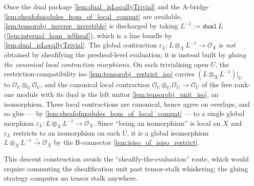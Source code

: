 \begin{remark}
  \label{rem:dual_discharges_inverse}
  Once the dual package \cref{lem:dual_isLocallyTrivial} and the A-bridge
  \cref{lem:sheafofmodules_hom_of_local_compat} are available,
  \cref{lem:tensorobj_inverse_invertible} is discharged by taking \(L^{-1} := \mathtt{dual}\,L\)
  (\cref{lem:internal_hom_isSheaf}), which is a line
  bundle by \cref{lem:dual_isLocallyTrivial}. The global contraction \(\varepsilon_L
  \colon L \otimes_X L^{-1} \to \mathcal{O}_X\) is \emph{not} obtained by sheafifying
  the presheaf-level evaluation; it is instead built by \emph{gluing the canonical local
  contraction morphisms}. On each trivialising open \(U\), the
  restriction-compatibility iso \cref{lem:tensorobj_restrict_iso} carries
  \((L \otimes_X L^{-1})|_U\) to \(\mathcal{O}_U \otimes_U \mathcal{O}_U\), and the
  canonical local contraction \(\mathcal{O}_U \otimes_U \mathcal{O}_U \to \mathcal{O}_U\)
  of the free rank-one module with its dual is the left unitor
  \cref{lem:tensorobj_unit_iso}, an isomorphism. These local contractions are canonical,
  hence agree on overlaps, and so glue --- by
  \cref{lem:sheafofmodules_hom_of_local_compat} --- to a single global morphism
  \(\varepsilon_L \colon L \otimes_X L^{-1} \to \mathcal{O}_X\). Since ``being an
  isomorphism'' is local on \(X\) and \(\varepsilon_L\) restricts to an isomorphism on
  each \(U\), it is a global isomorphism \(L \otimes_X L^{-1} \xrightarrow{\sim}
  \mathcal{O}_X\) by the B-connector \cref{lem:isiso_of_isiso_restrict}.

  This descent construction avoids the ``sheafify-the-evaluation'' route, which would
  require commuting the sheafification unit past tensor-stalk whiskering; the gluing strategy
  computes no tensor stalk anywhere.


\end{remark}
